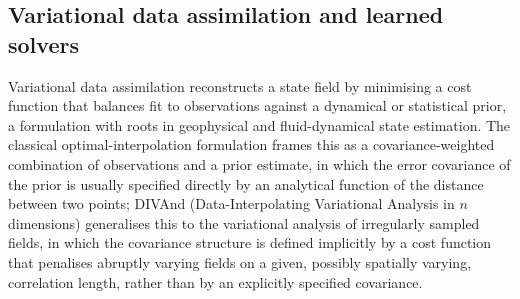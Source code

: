 \documentclass[english, 12pt, a4paper, elec, utf8, a-2b, online]{aaltothesis}
\begin{document}
\subsection{Variational data assimilation and learned solvers}
\label{sec:rw_vda}

Variational data assimilation reconstructs a state field by
minimising a cost function that balances fit to observations against
a dynamical or statistical prior, a formulation with roots in
geophysical and fluid-dynamical state estimation. The classical
optimal-interpolation formulation frames this as a
covariance-weighted combination of observations and a prior
estimate, in which the error covariance of the prior is usually
specified directly by an analytical function of the distance between
two points; DIVAnd (Data-Interpolating Variational Analysis in $n$
dimensions) \cite{barth2014divand} generalises this to the variational
analysis of irregularly sampled fields, in which the covariance structure is
defined implicitly by a cost function that penalises abruptly varying
fields on a given, possibly spatially varying, correlation length,
rather than by an explicitly specified covariance.
\end{document}

